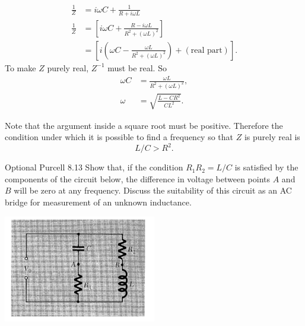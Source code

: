 \documentclass[makesolutionspdf]{esg8022pset}
\begin{document}
\begin{solution}
  \begin{align}
  \frac{1}{Z} & = i\omega C + \frac{1}{R+i\omega L}\nonumber\\
  \frac{1}{Z} & =\left[i\omega C+\frac{R-i\omega L}{R^2+(\omega
  L)^2}\right]\nonumber\\
  & = \left[ i(\omega C-\frac{\omega L}{R^2+(\omega
  L)^2})+(\text{real part})\right].
  \end{align}
  To make $Z$ purely real, $Z^{-1}$ must be real.  So
  \begin{align}
  \omega C & = \frac{\omega L}{R^2+(\omega L)^2},\\
  \omega & = \sqrt{\frac{L-CR^2}{CL^2}}.
  \end{align}

  Note that the argument inside a square root must be positive.
  Therefore the condition under which it is possible to find 
  a frequency so that $Z$ is purely real is 
  \begin{equation}
  L/C>R^2.
  \end{equation}
\end{solution}


\begin{problem}{Optional Purcell 8.13}
  Show that, if the condition $R_1R_2 = L / C$ is satisfied by the
  components of the circuit below, the difference in voltage between points
  $A$ and $B$ will be zero at any frequency.  Discuss the suitability of
  this circuit as an AC bridge for measurement of an unknown inductance.
  
  \begin{center}
    \includegraphics[width = 0.5\textwidth]{figpu813}
  \end{center}
\end{problem}
\end{document}
